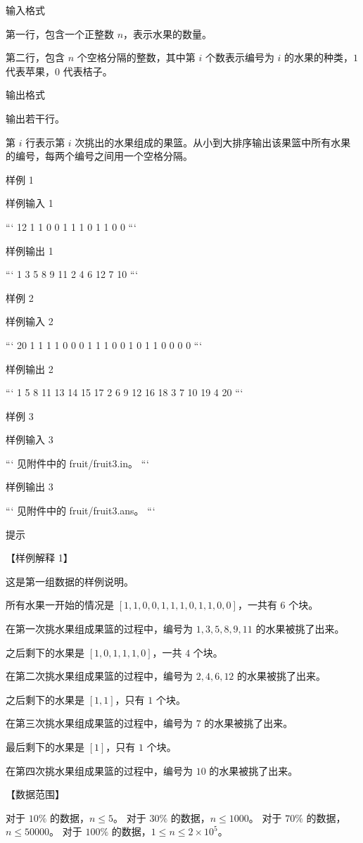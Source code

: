 \documentclass[12pt,twiside,a4paper]{ctexbook}
\numberwithin{chapter}{part}
\begin{document}
 输入格式

第一行，包含一个正整数 $n$，表示水果的数量。

第二行，包含 $n$ 个空格分隔的整数，其中第 $i$ 个数表示编号为 $i$ 的水果的种类，$1$ 代表苹果，$0$ 代表桔子。

 输出格式

输出若干行。

第 $i$ 行表示第 $i$ 次挑出的水果组成的果篮。从小到大排序输出该果篮中所有水果的编号，每两个编号之间用一个空格分隔。

 样例 1

 样例输入 1

```
12
1 1 0 0 1 1 1 0 1 1 0 0
```

 样例输出 1

```
1 3 5 8 9 11
2 4 6 12
7
10
```

 样例 2

 样例输入 2

```
20
1 1 1 1 0 0 0 1 1 1 0 0 1 0 1 1 0 0 0 0
```

 样例输出 2

```
1 5 8 11 13 14 15 17
2 6 9 12 16 18
3 7 10 19
4 20
```

 样例 3

 样例输入 3

```
见附件中的 fruit/fruit3.in。
```

 样例输出 3

```
见附件中的 fruit/fruit3.ans。
```

 提示

【样例解释 1】

这是第一组数据的样例说明。

所有水果一开始的情况是 $[1, 1, 0, 0, 1, 1, 1, 0, 1, 1, 0, 0]$，一共有 $6$ 个块。

在第一次挑水果组成果篮的过程中，编号为 $1, 3, 5, 8, 9, 11$ 的水果被挑了出来。

之后剩下的水果是 $[1, 0, 1, 1, 1, 0]$，一共 $4$ 个块。

在第二次挑水果组成果篮的过程中，编号为 $2, 4, 6, 12$ 的水果被挑了出来。

之后剩下的水果是 $[1, 1]$，只有 $1$ 个块。

在第三次挑水果组成果篮的过程中，编号为 $7$ 的水果被挑了出来。

最后剩下的水果是 $[1]$，只有 $1$ 个块。

在第四次挑水果组成果篮的过程中，编号为 $10$ 的水果被挑了出来。

【数据范围】

对于 $10 \%$ 的数据，$n \le 5$。  
对于 $30 \%$ 的数据，$n \le 1000$。  
对于 $70 \%$ 的数据，$n \le 50000$。  
对于 $100 \%$ 的数据，$1 \le n \le 2 \times {10}^5$。
\end{document}
